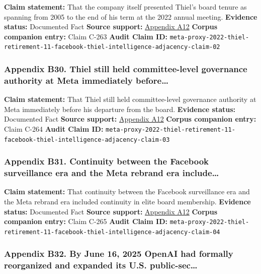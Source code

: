 \documentclass[
  american,
  11pt,
  letterpaper,
]{article}
\begin{document}
\textbf{Claim statement:} That the company itself presented Thiel's
board tenure as spanning from 2005 to the end of his term at the 2022
annual meeting. \textbf{Evidence status:} Documented Fact \textbf{Source
support:}
\hyperref[ch-07-appendix-a12-meta-platforms-inc-2022-definitive-proxy-statement]{Appendix
A12} \textbf{Corpus companion entry:} Claim C-263 \textbf{Audit Claim
ID:}
\texttt{meta-proxy-2022-thiel-retirement-11-facebook-thiel-intelligence-adjacency-claim-02}

\subsubsection{Appendix B30. Thiel still held committee-level governance
authority at Meta immediately
before\ldots{}}\label{ch-07-appendix-b30-thiel-still-held-committee-level-governance-authority-at-meta-immediately-before}

\textbf{Claim statement:} That Thiel still held committee-level
governance authority at Meta immediately before his departure from the
board. \textbf{Evidence status:} Documented Fact \textbf{Source
support:}
\hyperref[ch-07-appendix-a12-meta-platforms-inc-2022-definitive-proxy-statement]{Appendix
A12} \textbf{Corpus companion entry:} Claim C-264 \textbf{Audit Claim
ID:}
\texttt{meta-proxy-2022-thiel-retirement-11-facebook-thiel-intelligence-adjacency-claim-03}

\subsubsection{Appendix B31. Continuity between the Facebook
surveillance era and the Meta rebrand era
include\ldots{}}\label{ch-07-appendix-b31-continuity-between-the-facebook-surveillance-era-and-the-meta-rebrand-era-include}

\textbf{Claim statement:} That continuity between the Facebook
surveillance era and the Meta rebrand era included continuity in elite
board membership. \textbf{Evidence status:} Documented Fact
\textbf{Source support:}
\hyperref[ch-07-appendix-a12-meta-platforms-inc-2022-definitive-proxy-statement]{Appendix
A12} \textbf{Corpus companion entry:} Claim C-265 \textbf{Audit Claim
ID:}
\texttt{meta-proxy-2022-thiel-retirement-11-facebook-thiel-intelligence-adjacency-claim-04}

\subsubsection{Appendix B32. By June 16, 2025 OpenAI had formally
reorganized and expanded its U.S.
public-sec\ldots{}}\label{ch-07-appendix-b32-by-june-16-2025-openai-had-formally-reorganized-and-expanded-its-u-s-public-sec}
\end{document}
